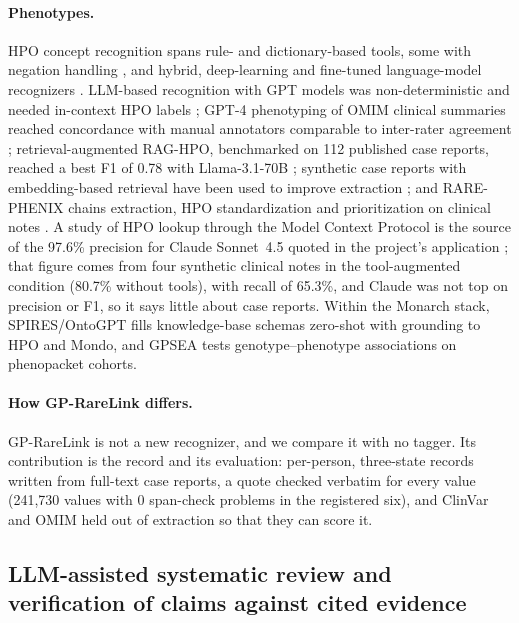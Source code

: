 \documentclass{article} %
\begin{document}
\paragraph{Phenotypes.} HPO concept recognition spans rule- and dictionary-based tools, some with negation handling \citep{Deisseroth2019ClinphenExtracts,Liu2019Doc2hpoWeb,Groza2024FasthpocrPragmatic}, and hybrid, deep-learning and fine-tuned language-model recognizers \citep{luo2021_phenotagger,Feng2023PhenobertCombined,yang2024_phenogpt}. LLM-based recognition with GPT models was non-deterministic and needed in-context HPO labels \citep{groza2024_gpt_hpo}; GPT-4 phenotyping of OMIM clinical summaries reached concordance with manual annotators comparable to inter-rater agreement \citep{Hier2024HighthroughputPhenotyping}; retrieval-augmented RAG-HPO, benchmarked on 112 published case reports, reached a best F1 of 0.78 with Llama-3.1-70B \citep{garcia2025_raghpo}; synthetic case reports with embedding-based retrieval have been used to improve extraction \citep{Albayrak2025EnhancingHuman}; and RARE-PHENIX chains extraction, HPO standardization and prioritization on clinical notes \citep{shyr2026_rarephenix}. A study of HPO lookup through the Model Context Protocol is the source of the 97.6\% precision for Claude Sonnet~4.5 quoted in the project's application \citep{larsen2026_hpo_mcp}; that figure comes from four synthetic clinical notes in the tool-augmented condition (80.7\% without tools), with recall of 65.3\%, and Claude was not top on precision or F1, so it says little about case reports. Within the Monarch stack, SPIRES/OntoGPT \citep{caufield2024_spires} fills knowledge-base schemas zero-shot with grounding to HPO and Mondo, and GPSEA \citep{rekerle2026_gpsea} tests genotype--phenotype associations on phenopacket cohorts.

\paragraph{How GP-RareLink differs.} GP-RareLink is not a new recognizer, and we compare it with no tagger. Its contribution is the record and its evaluation: per-person, three-state records written from full-text case reports, a quote checked verbatim for every value (241,730 values with 0 span-check problems in the registered six), and ClinVar and OMIM held out of extraction so that they can score it.

\subsection{LLM-assisted systematic review and verification of claims against cited evidence}
\end{document}
